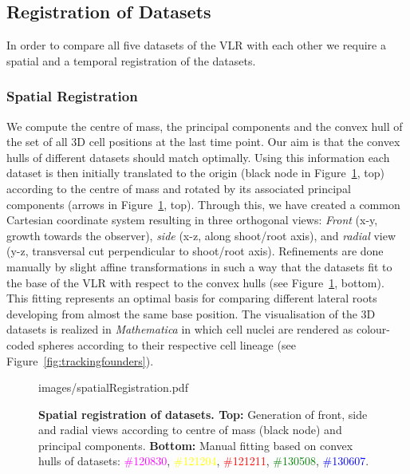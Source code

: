 \documentclass[11pt,a4paper, final]{article}
\begin{document}
\subsection{Registration of Datasets}
\label{sec:registration}
\noindent
In order to compare all five datasets of the VLR with each other we require a spatial and a temporal registration of the datasets. 

\subsubsection{Spatial Registration}
\noindent
We compute the centre of mass, the principal components and the convex hull of the set of all 3D cell positions at the last time point. Our aim is that the convex hulls of different datasets should match optimally. Using this information each dataset is then initially translated to the origin (black node in Figure~\ref{fig:spatialRegistration}, top) according to the centre of mass and rotated by its associated principal components (arrows in Figure~\ref{fig:spatialRegistration}, top). Through this, we have created a common Cartesian coordinate system resulting in three orthogonal views: \textit{Front} (x-y, growth towards the observer), \textit{side} (x-z, along shoot/root axis), and \textit{radial} view (y-z, transversal cut perpendicular to shoot/root axis). Refinements are done manually by slight affine transformations in such a way that the datasets fit to the base of the VLR with respect to the convex hulls (see Figure~\ref{fig:spatialRegistration}, bottom). This fitting represents an optimal basis for comparing different lateral roots developing from almost the same base position. The visualisation of the 3D datasets is realized in \textit{Mathematica} in which cell nuclei are rendered as
colour-coded spheres according to their respective cell lineage (see Figure~\ref{fig:trackingfounders}).
%
\begin{figure}[htbp]
	\begin{center}
		\begin{overpic}[width=1.\linewidth]{images/spatialRegistration.pdf}
		\end{overpic}
\caption[]
{
{\bf Spatial registration of datasets. Top:} Generation of front, side and radial views according to centre of mass (black node) and principal components. {\bf Bottom:} Manual fitting based on convex hulls of datasets: \textcolor{magenta}{\#120830}, \textcolor{yellow}{\#121204}, \textcolor{red}{\#121211}, \textcolor{green}{\#130508}, \textcolor{blue}{\#130607}.
}
	\label{fig:spatialRegistration}
	\end{center}
\end{figure}
%
\end{document}
